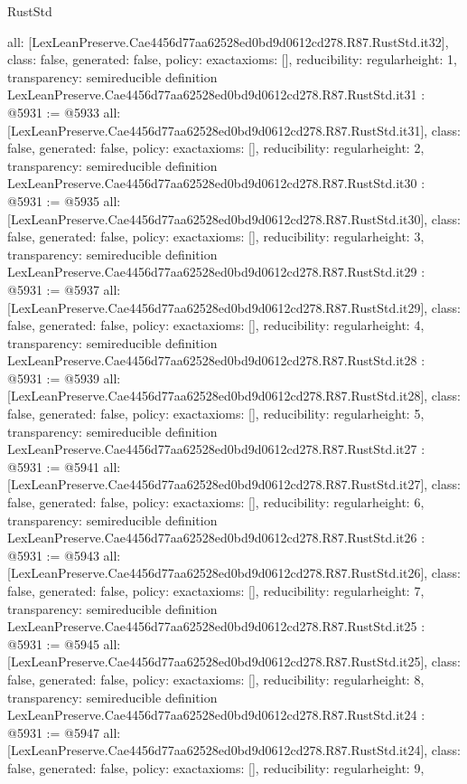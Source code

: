 \begin{lexlean}{RustStd}
\begin{coremodule}
{  all: [LexLeanPreserve.Cae4456d77aa62528ed0bd9d0612cd278.R87.RustStd.it32],
  class: false,
  generated: false,
  policy: exact{axioms: []},
  reducibility: regular{height: 1},
  transparency: semireducible
}
definition LexLeanPreserve.Cae4456d77aa62528ed0bd9d0612cd278.R87.RustStd.it31 : @5931 := @5933 {
  all: [LexLeanPreserve.Cae4456d77aa62528ed0bd9d0612cd278.R87.RustStd.it31],
  class: false,
  generated: false,
  policy: exact{axioms: []},
  reducibility: regular{height: 2},
  transparency: semireducible
}
definition LexLeanPreserve.Cae4456d77aa62528ed0bd9d0612cd278.R87.RustStd.it30 : @5931 := @5935 {
  all: [LexLeanPreserve.Cae4456d77aa62528ed0bd9d0612cd278.R87.RustStd.it30],
  class: false,
  generated: false,
  policy: exact{axioms: []},
  reducibility: regular{height: 3},
  transparency: semireducible
}
definition LexLeanPreserve.Cae4456d77aa62528ed0bd9d0612cd278.R87.RustStd.it29 : @5931 := @5937 {
  all: [LexLeanPreserve.Cae4456d77aa62528ed0bd9d0612cd278.R87.RustStd.it29],
  class: false,
  generated: false,
  policy: exact{axioms: []},
  reducibility: regular{height: 4},
  transparency: semireducible
}
definition LexLeanPreserve.Cae4456d77aa62528ed0bd9d0612cd278.R87.RustStd.it28 : @5931 := @5939 {
  all: [LexLeanPreserve.Cae4456d77aa62528ed0bd9d0612cd278.R87.RustStd.it28],
  class: false,
  generated: false,
  policy: exact{axioms: []},
  reducibility: regular{height: 5},
  transparency: semireducible
}
definition LexLeanPreserve.Cae4456d77aa62528ed0bd9d0612cd278.R87.RustStd.it27 : @5931 := @5941 {
  all: [LexLeanPreserve.Cae4456d77aa62528ed0bd9d0612cd278.R87.RustStd.it27],
  class: false,
  generated: false,
  policy: exact{axioms: []},
  reducibility: regular{height: 6},
  transparency: semireducible
}
definition LexLeanPreserve.Cae4456d77aa62528ed0bd9d0612cd278.R87.RustStd.it26 : @5931 := @5943 {
  all: [LexLeanPreserve.Cae4456d77aa62528ed0bd9d0612cd278.R87.RustStd.it26],
  class: false,
  generated: false,
  policy: exact{axioms: []},
  reducibility: regular{height: 7},
  transparency: semireducible
}
definition LexLeanPreserve.Cae4456d77aa62528ed0bd9d0612cd278.R87.RustStd.it25 : @5931 := @5945 {
  all: [LexLeanPreserve.Cae4456d77aa62528ed0bd9d0612cd278.R87.RustStd.it25],
  class: false,
  generated: false,
  policy: exact{axioms: []},
  reducibility: regular{height: 8},
  transparency: semireducible
}
definition LexLeanPreserve.Cae4456d77aa62528ed0bd9d0612cd278.R87.RustStd.it24 : @5931 := @5947 {
  all: [LexLeanPreserve.Cae4456d77aa62528ed0bd9d0612cd278.R87.RustStd.it24],
  class: false,
  generated: false,
  policy: exact{axioms: []},
  reducibility: regular{height: 9},
}
\end{coremodule}
\end{lexlean}
